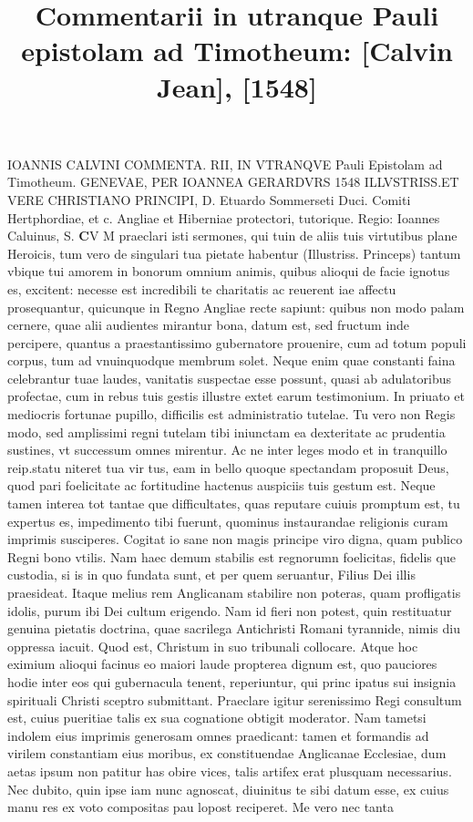 \documentclass{article}
\begin{document}
\date{}
        \title{Commentarii in utranque Pauli epistolam ad Timotheum: [Calvin Jean], [1548]}
\maketitle
\tableofcontents
\clearpage
\begin{pages} 
\beginnumbering
        IOANNIS CALVINI COMMENTA. RII, IN VTRANQVE Pauli Epistolam ad Timotheum. GENEVAE, PER IOANNEA GERARDVRS 1548 ILLVSTRISS.ET VERE CHRISTIANO PRINCIPI, D. Etuardo Sommerseti Duci. Comiti Hertphordiae, et c. Angliae et Hiberniae protectori, tutorique. Regio: Ioannes Caluinus, S. \pstart \huge\textbf{C}\normalsize V M praeclari isti sermones, qui tuin de aliis tuis virtutibus plane Heroicis, tum vero de singulari tua pietate habentur (Illustriss. Princeps) tantum vbique tui amorem in bonorum omnium animis, quibus alioqui de facie ignotus es, excitent: necesse est incredibili te charitatis ac reuerent iae affectu prosequantur, quicunque in Regno Angliae recte sapiunt: quibus non modo palam cernere, quae alii audientes mirantur bona, datum est, sed fructum inde percipere, quantus a praestantissimo gubernatore prouenire, cum ad totum populi corpus, tum ad vnuinquodque membrum solet. Neque enim quae constanti faina celebrantur tuae laudes, vanitatis suspectae esse possunt, quasi ab adulatoribus profectae, cum in rebus tuis gestis illustre extet earum testimonium. In priuato et mediocris fortunae pupillo, difficilis est administratio tutelae. Tu vero non Regis modo, sed amplissimi regni tutelam tibi iniunctam ea dexteritate ac prudentia sustines, vt successum omnes mirentur. Ac ne inter leges modo et in tranquillo reip.statu niteret tua vir  \pend\pstart tus, eam in bello quoque spectandam proposuit Deus, quod pari foelicitate ac fortitudine hactenus auspiciis tuis gestum est. Neque tamen interea tot tantae que difficultates, quas reputare cuiuis promptum est, tu expertus es, impedimento tibi fuerunt, quominus instaurandae religionis curam imprimis susciperes. Cogitat io sane non magis principe viro digna, quam publico Regni bono vtilis. Nam haec demum stabilis est regnorumn foelicitas, fidelis que custodia, si is in quo fundata sunt, et per quem seruantur, Filius Dei illis praesideat. Itaque melius rem Anglicanam stabilire non poteras, quam profligatis idolis, purum ibi Dei cultum erigendo. Nam id fieri non potest, quin restituatur genuina pietatis doctrina, quae sacrilega Antichristi Romani tyrannide, nimis diu oppressa iacuit. Quod est, Christum in suo tribunali collocare. Atque hoc eximium alioqui facinus eo maiori laude propterea dignum est, quo pauciores hodie inter eos qui gubernacula tenent, reperiuntur, qui princ ipatus sui insignia spirituali Christi sceptro submittant. Praeclare igitur serenissimo Regi consultum est, cuius pueritiae talis ex sua cognatione obtigit moderator. Nam tametsi indolem eius imprimis generosam omnes praedicant: tamen et formandis ad virilem constantiam eius moribus, ex constituendae Anglicanae Ecclesiae, dum aetas ipsum non patitur has obire vices, ta\pend\pstart lis artifex erat plusquam necessarius. Nec dubito, quin ipse iam nunc agnoscat, diuinitus te sibi datum esse, ex cuius manu res ex voto compositas pau lopost reciperet. Me vero nec tanta 
\end{pages}
\end{document}
